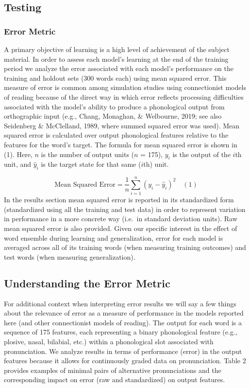 \documentclass[
  ,man,floatsintext]{apa6}
\begin{document}
\subsection{Testing}\label{testing}

\subsubsection{Error Metric}\label{error-metric}

A primary objective of learning is a high level of achievement of the subject material. In order to assess each model's learning at the end of the training period we analyze the error associated with each model's performance on the training and holdout sets (300 words each) using mean squared error. This measure of error is common among simulation studies using connectionist models of reading because of the direct way in which error reflects processing difficulties associated with the model's ability to produce a phonological output from orthographic input (e.g., Chang, Monaghan, \& Welbourne, 2019; see also Seidenberg \& McClelland, 1989, where summed squared error was used). Mean squared error is calculated over output phonological features relative to the features for the word's target. The formula for mean squared error is shown in (1). Here, \(n\) is the number of output units (\(n\) = 175), \(y_i\) is the output of the \(i\)th unit, and \(\hat{y}_i\) is the target state for that same (\(i\)th) unit.

\[
\text{Mean Squared Error} = \frac{1}{n} \sum_{i=1}^{n} (y_i - \hat{y}_i)^2
\quad (1) 
\]
In the results section mean squared error is reported in its standardized form (standardized using all the training and test data) in order to represent variation in performance in a more concrete way (i.e.~in standard deviation units). Raw mean squared error is also provided. Given our specific interest in the effect of word ensemble during learning and generalization, error for each model is averaged across all of its training words (when measuring training outcomes) and test words (when measuring generalization).

\subsection{Understanding the Error Metric}\label{understanding-the-error-metric}

For additional context when interpreting error results we will say a few things about the relevance of error as a measure of performance in the models reported here (and other connectionist models of reading). The output for each word is a sequence of 175 features, each representing a binary phonological feature (e.g., plosive, nasal, bilabial, etc.) within a phonological slot associated with pronunciation. We analyze results in terms of performance (error) in the output features because it allows for continuously graded data on pronunciation. Table 2 provides examples of minimal pairs of alternative pronunciations and the corresponding impact on error (raw and standardized) on output features.
\end{document}
